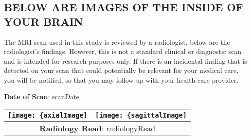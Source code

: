 \subsection{BELOW ARE IMAGES OF THE INSIDE OF YOUR BRAIN}

The MRI scan used in this study is reviewed by a radiologist, below are the
radiologist's findings. However, this is not a standard clinical or diagnostic
scan and is intended for research purposes only. If there is an incidental
finding that is detected on your scan that could potentially be relevant for
your medical care, you will be notified, so that you may follow up with your
health care provider.

\textbf{Date of Scan}: {{scanDate}}

\setlength{\arrayrulewidth}{0.65mm}

\begin{table}[h!]
    \centering
    \begin{tabular}{cc}
        \texttt{[image: \{axialImage]}} & \texttt{[image: \{sagittalImage]}}
        \\ \hline
        \multicolumn{2}{c}{\parbox{0.8\textwidth}{\raggedright \vspace*{5mm} \textbf{Radiology Read}: {{radiologyRead}} \vspace*{5mm}}} 
        \\ \hline
    \end{tabular}
\end{table}
